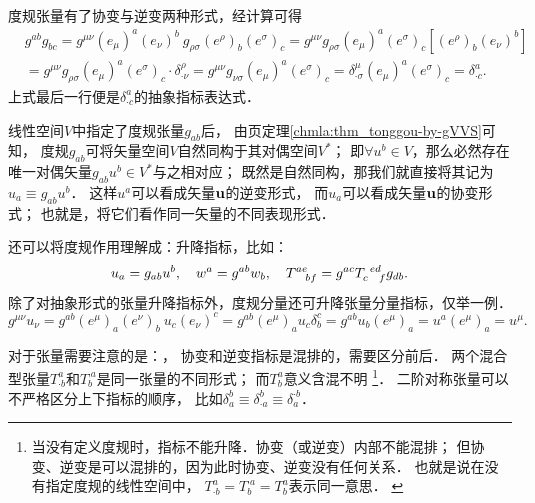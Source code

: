 度规张量有了协变与逆变两种形式，经计算可得
\begin{equation}
\begin{aligned}
    &g^{ab}g_{bc} = g^{\mu\nu} (e_\mu)^a (e_\nu)^b \ 
       g_{\rho\sigma} (e^\rho)_b (e^\sigma)_c
       =g^{\mu\nu}g_{\rho\sigma}(e_\mu)^a (e^\sigma)_c
       \left[(e^\rho)_b (e_\nu)^b \right] \\
    &= g^{\mu\nu}g_{\rho\sigma}(e_\mu)^a (e^\sigma)_c \cdot \delta^\rho _{\cdot \nu} 
     = g^{\mu\nu}g_{\nu\sigma}(e_\mu)^a (e^\sigma)_c 
    = \delta^\mu _{\cdot \sigma} (e_\mu)^a (e^\sigma)_c 
    = \delta^a_{\cdot c} .
\end{aligned}
\end{equation}
上式最后一行便是$\delta^a_{\cdot c}$的抽象指标表达式．


线性空间$V$中指定了度规张量$g_{ab}$后，
由\pageref{chmla:thm_tonggou-by-gVVS}页定理\ref{chmla:thm_tonggou-by-gVVS}可知，
度规$g_{ab}$可将矢量空间$V${\kaishu 自然同构}于其对偶空间$V^*$；
即$\forall u^b \in V$，那么必然存在唯一对偶矢量$g_{ab}u^b\in V^*$与之相对应；
既然是自然同构，那我们就直接将其记为$u_a \equiv g_{ab}u^b$．
这样$u^a$可以看成矢量$\bf u$的逆变形式，
而$u_a$可以看成矢量$\bf u$的协变形式；
也就是，将它们看作同一矢量的不同表现形式．


还可以将度规作用理解成：升降指标，比如：
\begin{equation*}
    u_a =g_{ab}u^b, \quad w^a=g^{ab}w_b, \quad
    T^{ae}_{\hphantom{ae} bf}=g^{ac}T^{\hphantom{c} ed}_{c \hphantom{ed} f}g_{db} .
\end{equation*}
除了对抽象形式的张量升降指标外，度规分量还可升降张量分量指标，仅举一例．
\begin{equation*}
    g^{\mu\nu} u_\nu = g^{ab} (e^\mu)_a (e^\nu)_b \ u_c (e_\nu)^c
    =g^{ab} (e^\mu)_a  u_c \delta^c_b
    =g^{ab} u_b (e^\mu)_a  = u^a(e^\mu)_a = u^\mu .
\end{equation*}


对于张量需要注意的是：{\kaishu{}}，
协变和逆变指标是{\heiti{}}混排的，需要区分前后．
两个混合型张量$T^{a}_{\cdot b}$和$T^{\cdot a}_{b}$是同一张量的不同形式；
而$T^{a}_{b}$意义含混不明
{\footnote{当没有定义度规时，指标不能升降．协变（或逆变）内部不能混排；
        但协变、逆变是可以混排的，因为此时协变、逆变没有任何关系．
        也就是说在没有指定度规的线性空间中，
        $T^{a}_{\cdot b}=T^{\cdot a}_{b}=T^{a}_{b}$表示同一意思．
        \label{chdm:ft_index}}}．
二阶{\kaishu 对称}张量可以不严格区分上下指标的顺序，
比如$\delta_{a}^{b}\equiv \delta_{\cdot a}^{b}\equiv \delta_{a}^{\cdot b}$．

